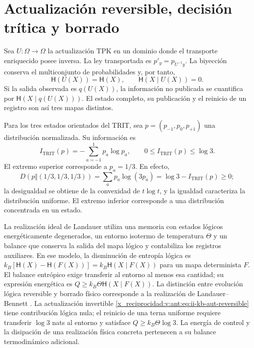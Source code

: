 \section{Actualización reversible, decisión trítica y borrado}

Sea \(U:\Omega\to\Omega\) la actualización TPK en un dominio donde
el transporte enriquecido posee inversa. La ley transportada es
\(p'_y=p_{U^{-1}y}\). La biyección conserva el multiconjunto de
probabilidades y, por tanto,
\begin{equation}
 \mathsf H(U(X))=\mathsf H(X),\qquad
 \mathsf H(X\mid U(X))=0.
 \label{x_reciprocidad:v:ant:eq:ii-kb-aut-reversible}
\end{equation}
Si la salida observada es \(q(U(X))\), la información no publicada
se cuantifica por \(\mathsf H(X\mid q(U(X)))\). El estado completo,
su publicación y el reinicio de un registro son así tres mapas distintos.

Para los tres estados orientados del TRIT, sea
\(p=(p_{-1},p_0,p_{+1})\) una distribución normalizada. Su información es
\begin{equation}
 I_{\mathrm{TRIT}}(p)=-\sum_{a=-1}^{1}p_a\log p_a,
 \qquad 0\leq I_{\mathrm{TRIT}}(p)\leq\log3.
 \label{x_reciprocidad:v:ant:eq:ii-kb-aut-trit}
\end{equation}
El extremo superior corresponde a \(p_a=1/3\). En efecto,
\[
 D(p\Vert(1/3,1/3,1/3))
 =\sum_ap_a\log(3p_a)=\log3-I_{\mathrm{TRIT}}(p)\geq0;
\]
la desigualdad se obtiene de la convexidad de \(t\log t\), y la
igualdad caracteriza la distribución uniforme. El extremo inferior
corresponde a una distribución concentrada en un estado.

La realización ideal de Landauer utiliza una memoria con estados lógicos
energéticamente degenerados, un entorno isotermo de temperatura \(\Theta\)
y un balance que conserva la salida del mapa lógico y contabiliza los
registros auxiliares. En ese modelo, la disminución de entropía lógica es
\(k_B[\mathsf H(X)-\mathsf H(F(X))]
=k_B\mathsf H(X\mid F(X))\) para un mapa determinista \(F\).
El balance entrópico exige transferir al entorno al menos esa cantidad;
su expresión energética es \(Q\geq k_B\Theta\mathsf H(X\mid F(X))\).
La distinción entre evolución lógica reversible y borrado físico
corresponde a la realización de Landauer--Bennett \cite{x_reciprocidad:bennett2003}.
La actualización invertible
\eqref{x_reciprocidad:v:ant:eq:ii-kb-aut-reversible} tiene contribución lógica nula; el
reinicio de una terna uniforme requiere transferir \(\log3\) nats
al entorno y satisface \(Q\geq k_B\Theta\log3\).
La energía de control y la disipación de una realización física
concreta pertenecen a su balance termodinámico adicional.

